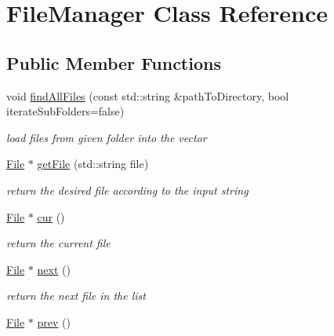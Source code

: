 \hypertarget{classFileManager}{}\section{File\+Manager Class Reference}
\label{classFileManager}
\subsection*{Public Member Functions}
\begin{DoxyCompactItemize}
\item 
void \hyperlink{classFileManager_a680c9b330d3e7413b060f6a60469f3ea}{find\+All\+Files} (const std\+::string \&path\+To\+Directory, bool iterate\+Sub\+Folders=false)
\begin{DoxyCompactList}\small\item\em load files from given folder into the vector \end{DoxyCompactList}\item 
\hyperlink{classFile}{File} $\ast$ \hyperlink{classFileManager_a68eefdb3cac178dcdc362fa0540935f1}{get\+File} (std\+::string file)
\begin{DoxyCompactList}\small\item\em return the desired file according to the input string \end{DoxyCompactList}\item 
\hyperlink{classFile}{File} $\ast$ \hyperlink{classFileManager_add9d81378b7f8b2a4ca16534fb5e6e65}{cur} ()\hypertarget{classFileManager_add9d81378b7f8b2a4ca16534fb5e6e65}{}\label{classFileManager_add9d81378b7f8b2a4ca16534fb5e6e65}

\begin{DoxyCompactList}\small\item\em return the current file \end{DoxyCompactList}\item 
\hyperlink{classFile}{File} $\ast$ \hyperlink{classFileManager_a2febd9b963808301e5613725003c8a69}{next} ()\hypertarget{classFileManager_a2febd9b963808301e5613725003c8a69}{}\label{classFileManager_a2febd9b963808301e5613725003c8a69}

\begin{DoxyCompactList}\small\item\em return the next file in the list \end{DoxyCompactList}\item 
\hyperlink{classFile}{File} $\ast$ \hyperlink{classFileManager_a524986b94326739ec42aab6c9b7c1f78}{prev} ()\hypertarget{classFileManager_a524986b94326739ec42aab6c9b7c1f78}{}\label{classFileManager_a524986b94326739ec42aab6c9b7c1f78}


\end{DoxyCompactItemize}
